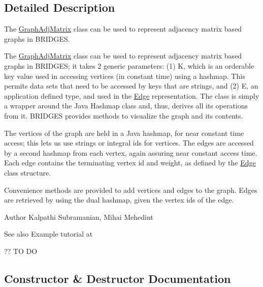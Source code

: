 \subsection{Detailed Description}
The \hyperlink{class_bridges_1_1_graph_adj_matrix_1_1_graph_adj_matrix}{Graph\+Adj\+Matrix} class can be used to represent adjacency matrix based graphs in B\+R\+I\+D\+G\+E\+S. 

The \hyperlink{class_bridges_1_1_graph_adj_matrix_1_1_graph_adj_matrix}{Graph\+Adj\+Matrix} class can be used to represent adjacency matrix based graphs in B\+R\+I\+D\+G\+E\+S; it takes 2 generic parameters\+: (1) K, which is an orderable key value used in accessing vertices (in constant time) using a hashmap. This permits data sets that need to be accessed by keys that are strings, and (2) E, an application defined type, and used in the \hyperlink{namespace_bridges_1_1_edge}{Edge} representation. The class is simply a wrapper around the Java Hashmap class and, thus, derives all its operations from it. B\+R\+I\+D\+G\+E\+S provides methods to visualize the graph and its contents.

The vertices of the graph are held in a Java hashmap, for near constant time access; this lets us use strings or integral ids for vertices. The edges are accessed by a second hashmap from each vertex, again assuring near constant access time. Each edge contains the terminating vertex id and weight, as defined by the \hyperlink{namespace_bridges_1_1_edge}{Edge} class structure.

Convenience methods are provided to add vertices and edges to the graph. Edges are retrieved by using the dual hashmap, given the vertex ids of the edge.

\begin{DoxyAuthor}{Author}
Kalpathi Subramanian, Mihai Mehedint
\end{DoxyAuthor}
\begin{DoxySeeAlso}{See also}
Example tutorial at 
\end{DoxySeeAlso}
?? T\+O D\+O 

\subsection{Constructor \& Destructor Documentation}
\hypertarget{class_bridges_1_1_graph_adj_matrix_1_1_graph_adj_matrix_a37c7e1e707729b2baeea457f57e0592d}{}

